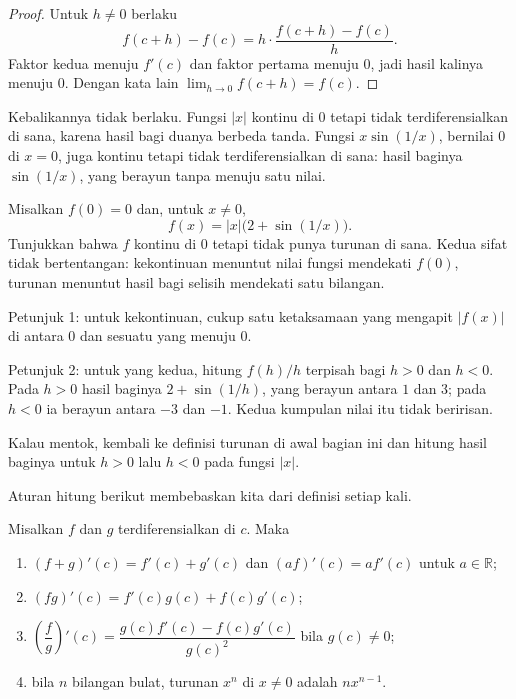 \begin{proof}
Untuk $h\neq0$ berlaku
\[
  f(c+h)-f(c)=h\cdot\frac{f(c+h)-f(c)}{h}.
\]
Faktor kedua menuju $f'(c)$ dan faktor pertama menuju $0$, jadi hasil kalinya menuju $0$.
Dengan kata lain $\lim_{h\to0}f(c+h)=f(c)$.
\end{proof}

Kebalikannya tidak berlaku. Fungsi $|x|$ kontinu di $0$ tetapi tidak terdiferensialkan di
sana, karena hasil bagi duanya berbeda tanda. Fungsi $x\sin(1/x)$, bernilai $0$ di $x=0$,
juga kontinu tetapi tidak terdiferensialkan di sana: hasil baginya $\sin(1/x)$, yang berayun
tanpa menuju satu nilai.

\begin{tantangan}
Misalkan $f(0)=0$ dan, untuk $x\neq0$,
\[
  f(x)=|x|\bigl(2+\sin(1/x)\bigr).
\]
Tunjukkan bahwa $f$ kontinu di $0$ tetapi tidak punya turunan di sana. Kedua sifat tidak
bertentangan: kekontinuan menuntut nilai fungsi mendekati $f(0)$, turunan menuntut hasil
bagi selisih mendekati satu bilangan.

Petunjuk 1: untuk kekontinuan, cukup satu ketaksamaan yang mengapit $|f(x)|$ di antara $0$
dan sesuatu yang menuju $0$.

Petunjuk 2: untuk yang kedua, hitung $f(h)/h$ terpisah bagi $h>0$ dan $h<0$. Pada $h>0$
hasil baginya $2+\sin(1/h)$, yang berayun antara $1$ dan $3$; pada $h<0$ ia berayun antara
$-3$ dan $-1$. Kedua kumpulan nilai itu tidak beririsan.

Kalau mentok, kembali ke definisi turunan di awal bagian ini dan hitung hasil baginya untuk
$h>0$ lalu $h<0$ pada fungsi $|x|$.
\end{tantangan}

Aturan hitung berikut membebaskan kita dari definisi setiap kali.

\begin{teorema}
Misalkan $f$ dan $g$ terdiferensialkan di $c$. Maka
\begin{enumerate}
  \item $(f+g)'(c)=f'(c)+g'(c)$ dan $(af)'(c)=a f'(c)$ untuk $a\in\mathbb{R}$;
  \item $(fg)'(c)=f'(c)g(c)+f(c)g'(c)$;
  \item $\left(\dfrac{f}{g}\right)'(c)=\dfrac{g(c)f'(c)-f(c)g'(c)}{g(c)^{2}}$ bila
        $g(c)\neq0$;
  \item bila $n$ bilangan bulat, turunan $x^{n}$ di $x\neq0$ adalah $nx^{n-1}$.
\end{enumerate}
\end{teorema}

